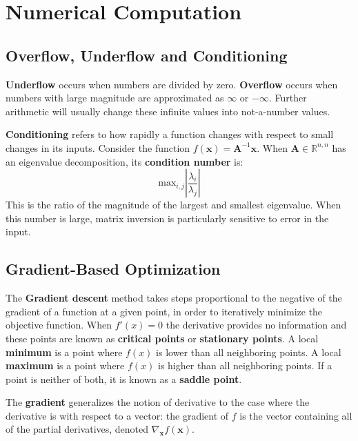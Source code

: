 \documentclass[12pt]{report}
\begin{document}
\chapter{Numerical Computation}
    \section{Overflow, Underflow and Conditioning}
        \textbf{Underflow} occurs when numbers are divided by zero.
        \textbf{Overflow} occurs when numbers with large magnitude are approximated as $\infty$ or $−\infty$. Further arithmetic will usually change these infinite values into not-a-number values.
        
        \textbf{Conditioning} refers to how rapidly a function changes with respect to small changes in its inputs. Consider the function $f(\boldsymbol{x}) = \boldsymbol{A}^{-1}\boldsymbol{x}$. When $\boldsymbol{A} \in \mathbb{R}^{n,n}$ has an eigenvalue decomposition, its \textbf{condition number} is:
        \begin{equation}
            \text{max}_{i,j}\left|\frac{\lambda_i}{\lambda_j}\right|
        \end{equation}
        This is the ratio of the magnitude of the largest and smallest eigenvalue. When this number is large, matrix inversion is particularly sensitive to error in the input.
    \section{Gradient-Based Optimization}
        The \textbf{Gradient descent} method takes steps proportional to the negative of the gradient of a function at a given point, in order to iteratively minimize the objective function. When $f'(x) = 0$ the derivative provides no information and these points are known as \textbf{critical points} or \textbf{stationary points}. A local \textbf{minimum} is a point where $f(x)$ is lower than all neighboring points. A local \textbf{maximum} is a point where $f(x)$ is higher than all neighboring points. If a point is neither of both, it is known as a \textbf{saddle point}.
        
        The \textbf{gradient} generalizes the notion of derivative to the case where the derivative is with respect to a vector: the gradient of $f$ is the vector containing all of the partial derivatives, denoted $\nabla_{\boldsymbol{x}}f(\boldsymbol{x})$.
        
\end{document}
